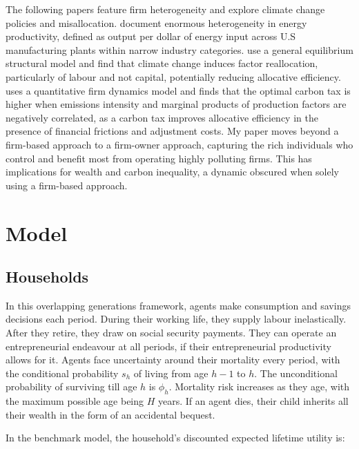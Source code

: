 \documentclass[12pt,a4paper]{article}
\begin{document}
\hspace*{6mm} The following papers feature firm heterogeneity and explore climate change policies and misallocation. \cite{lyubich2018regulating} document enormous heterogeneity in energy productivity, defined as output per dollar of energy input across U.S manufacturing plants within narrow industry categories. \cite{caggese2024climate} use a general equilibrium structural model and find that climate change induces factor reallocation, particularly of labour and not capital, potentially reducing allocative efficiency.  \cite{kim2023optimal} uses a quantitative firm dynamics model and finds that the optimal carbon tax is higher when emissions intensity and marginal products of production factors are negatively correlated, as a carbon tax improves allocative efficiency in the presence of financial frictions and adjustment costs. My paper moves beyond a firm-based approach to a firm-owner approach, capturing the rich individuals who control and benefit most from operating highly polluting firms. This has implications for wealth and carbon inequality, a dynamic obscured when solely using a firm-based approach. 



\section{Model}



\subsection{\normalsize Households}


\hspace*{6mm} In this overlapping generations framework, agents make consumption and savings decisions each period. During their working life, they supply labour inelastically. After they retire, they draw on social security payments. They can operate an entrepreneurial endeavour at all periods, if their entrepreneurial productivity allows for it. Agents face uncertainty around their mortality every period, with the conditional probability $s_h$ of living from age $h-1$ to $h$. The unconditional probability of surviving till age $h$ is $\phi_{h}$. Mortality risk increases as they age, with the maximum possible age being $H$ years. If an agent dies, their child inherits all their wealth in the form of an accidental bequest. 

In the benchmark model, the household's discounted expected lifetime utility is:
\end{document}
